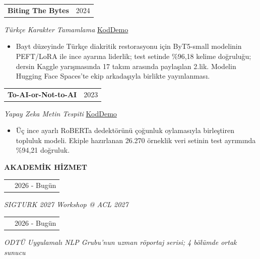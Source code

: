 \documentclass[11pt,a4paper]{article}
\makeatletter
\newcommand{\cvlink}[2]{\href{#1}{\textcolor{linkblue}{#2}}}
\newcommand{\cvul}{\bgroup\markoverwith{\textcolor{muted!45}{\rule[-0.45ex]{2pt}{0.35pt}}}\ULon}
\newcommand{\hlink}[2]{\href{#1}{\cvul{#2}}}
\newcommand{\cvsep}{\enspace\textperiodcentered\enspace{}}
\newcommand{\cvsection}[3][5]{%
  \par\Needspace*{#1\baselineskip}\vspace{6pt}%
  {\bfseries\fontsize{11}{13}\selectfont #3}\par\nobreak
  \vspace{3pt}{\color{muted}\hrule height 0.4pt}\nobreak\vspace{6pt}%
}
\newcommand{\cvheading}[2]{%
  \begin{tabularx}{\linewidth}{@{}>{\raggedright\arraybackslash}X@{\hspace{10pt}}r@{}}%
  \textbf{#1} & {\small\color{muted}#2}\\
  \end{tabularx}\par\nobreak
}
\newenvironment{cvpoints}{\begin{itemize}[leftmargin=12pt,itemsep=2pt,topsep=2pt,parsep=0pt]\small}{\end{itemize}}
\makeatother
\begin{document}
\begin{minipage}{\linewidth}\raggedright
\cvheading{Biting The Bytes}{2024}
{\small{}\itshape{}\color{muted}Türkçe Karakter Tamamlama}\hfill{\small{}%
\mbox{\cvlink{https://github.com/rusen-archive/Biting-The-Bytes}{Kod}}\cvsep\mbox{\cvlink{https://huggingface.co/spaces/rusen/diacritize-tr}{Demo}}%
}\par\vspace{2pt}
\begin{cvpoints}
\item Bayt düzeyinde Türkçe diakritik restorasyonu için ByT5-small modelinin PEFT/LoRA ile ince ayarına liderlik; test setinde \%96,18 kelime doğruluğu; dersin Kaggle yarışmasında 17 takım arasında paylaşılan 2.lik. Modelin Hugging Face Spaces’te ekip arkadaşıyla birlikte yayınlanması.
\end{cvpoints}
\end{minipage}\par\vspace{5pt}
\begin{minipage}{\linewidth}\raggedright
\cvheading{To-AI-or-Not-to-AI}{2023}
{\small{}\itshape{}\color{muted}Yapay Zeka Metin Tespiti}\hfill{\small{}%
\mbox{\cvlink{https://github.com/rusen-archive/To-AI-or-Not-to-AI}{Kod}}\cvsep\mbox{\cvlink{https://huggingface.co/spaces/rusen/gpt_detector}{Demo}}%
}\par\vspace{2pt}
\begin{cvpoints}
\item Üç ince ayarlı RoBERTa dedektörünü çoğunluk oylamasıyla birleştiren topluluk modeli. Ekiple hazırlanan 26.270 örneklik veri setinin test ayrımında \%94,21 doğruluk.
\end{cvpoints}
\end{minipage}\par\vspace{5pt}


\cvsection{}{AKADEMİK HİZMET}
\cvheading{\small{}\hlink{https://sigturk.github.io/workshops/2027/shared-task/}{Shared Task Ortak Organizatörü, SIGTURK 2027}}{2026 - Bugün}
{\small{}\itshape{}\color{muted}SIGTURK 2027 Workshop @ ACL 2027}\par\vspace{4pt}
\cvheading{\small{}\hlink{https://www.youtube.com/@metunlpconnect}{Yürütücü, METU NLP Connect}}{2026 - Bugün}
{\small{}\itshape{}\color{muted}ODTÜ Uygulamalı NLP Grubu'nun uzman röportaj serisi; 4 bölümde ortak sunucu}\par\vspace{4pt}
\end{document}
